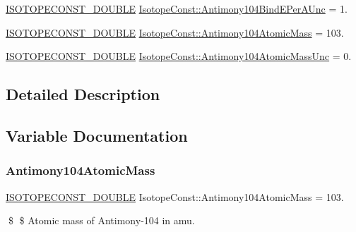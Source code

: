 \begin{DoxyCompactItemize}
\mbox{\hyperlink{group___isotope_const-_macros_ga8f45a7272ce02c0b4c65c44636ed719a}{I\+S\+O\+T\+O\+P\+E\+C\+O\+N\+S\+T\+\_\+\+D\+O\+U\+B\+LE}} \mbox{\hyperlink{group___isotope_const-_antimony-_sb104_ga3f33c0347d6d08296b87dc5f8ffcb916}{Isotope\+Const\+::\+Antimony104\+Bind\+E\+Per\+A\+Unc}} = 1.
\item 
\mbox{\hyperlink{group___isotope_const-_macros_ga8f45a7272ce02c0b4c65c44636ed719a}{I\+S\+O\+T\+O\+P\+E\+C\+O\+N\+S\+T\+\_\+\+D\+O\+U\+B\+LE}} \mbox{\hyperlink{group___isotope_const-_antimony-_sb104_gaed727b97f1e3931281efc7267b99b914}{Isotope\+Const\+::\+Antimony104\+Atomic\+Mass}} = 103.
\item 
\mbox{\hyperlink{group___isotope_const-_macros_ga8f45a7272ce02c0b4c65c44636ed719a}{I\+S\+O\+T\+O\+P\+E\+C\+O\+N\+S\+T\+\_\+\+D\+O\+U\+B\+LE}} \mbox{\hyperlink{group___isotope_const-_antimony-_sb104_gad09d3b80b226b3941833809d80f17357}{Isotope\+Const\+::\+Antimony104\+Atomic\+Mass\+Unc}} = 0.
\end{DoxyCompactItemize}


\subsection{Detailed Description}


\subsection{Variable Documentation}
\mbox{\label{group___isotope_const-_antimony-_sb104_gaed727b97f1e3931281efc7267b99b914}} 
\subsubsection{\texorpdfstring{Antimony104\+Atomic\+Mass}{Antimony104AtomicMass}}
{\footnotesize\ttfamily \mbox{\hyperlink{group___isotope_const-_macros_ga8f45a7272ce02c0b4c65c44636ed719a}{I\+S\+O\+T\+O\+P\+E\+C\+O\+N\+S\+T\+\_\+\+D\+O\+U\+B\+LE}} Isotope\+Const\+::\+Antimony104\+Atomic\+Mass = 103.}

\$ \$ Atomic mass of Antimony-\/104 in amu. \mbox{\label{group___isotope_const-_antimony-_sb104_gad09d3b80b226b3941833809d80f17357}} 
